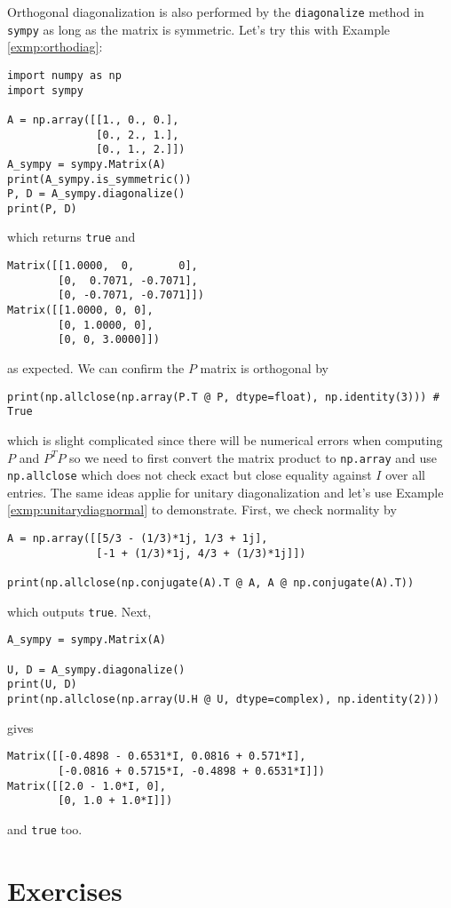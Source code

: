 Orthogonal diagonalization is also performed by the \verb|diagonalize| method in \texttt{sympy} as long as the matrix is symmetric. Let's try this with Example \ref{exmp:orthodiag}:
\begin{lstlisting}
import numpy as np
import sympy

A = np.array([[1., 0., 0.],
              [0., 2., 1.],
              [0., 1., 2.]])
A_sympy = sympy.Matrix(A)
print(A_sympy.is_symmetric())
P, D = A_sympy.diagonalize()
print(P, D)    
\end{lstlisting}
which returns \verb|true| and
\begin{lstlisting}
Matrix([[1.0000,  0,       0], 
        [0,  0.7071, -0.7071], 
        [0, -0.7071, -0.7071]])
Matrix([[1.0000, 0, 0], 
        [0, 1.0000, 0], 
        [0, 0, 3.0000]])    
\end{lstlisting}
as expected. We can confirm the $P$ matrix is orthogonal by
\begin{lstlisting}
print(np.allclose(np.array(P.T @ P, dtype=float), np.identity(3))) # True
\end{lstlisting}
which is slight complicated since there will be numerical errors when computing $P$ and $P^T P$ so we need to first convert the matrix product to \verb|np.array| and use \verb|np.allclose| which does not check exact but close equality against $I$ over all entries. The same ideas applie for unitary diagonalization and let's use Example \ref{exmp:unitarydiagnormal} to demonstrate. First, we check normality by 
\begin{lstlisting}
A = np.array([[5/3 - (1/3)*1j, 1/3 + 1j],
              [-1 + (1/3)*1j, 4/3 + (1/3)*1j]])

print(np.allclose(np.conjugate(A).T @ A, A @ np.conjugate(A).T))
\end{lstlisting}
which outputs \verb|true|. Next,
\begin{lstlisting}
A_sympy = sympy.Matrix(A)

U, D = A_sympy.diagonalize()
print(U, D)
print(np.allclose(np.array(U.H @ U, dtype=complex), np.identity(2)))   
\end{lstlisting}
gives
\begin{lstlisting}
Matrix([[-0.4898 - 0.6531*I, 0.0816 + 0.571*I], 
        [-0.0816 + 0.5715*I, -0.4898 + 0.6531*I]]) 
Matrix([[2.0 - 1.0*I, 0], 
        [0, 1.0 + 1.0*I]])  
\end{lstlisting}
and \verb|true| too.

\section{Exercises}

